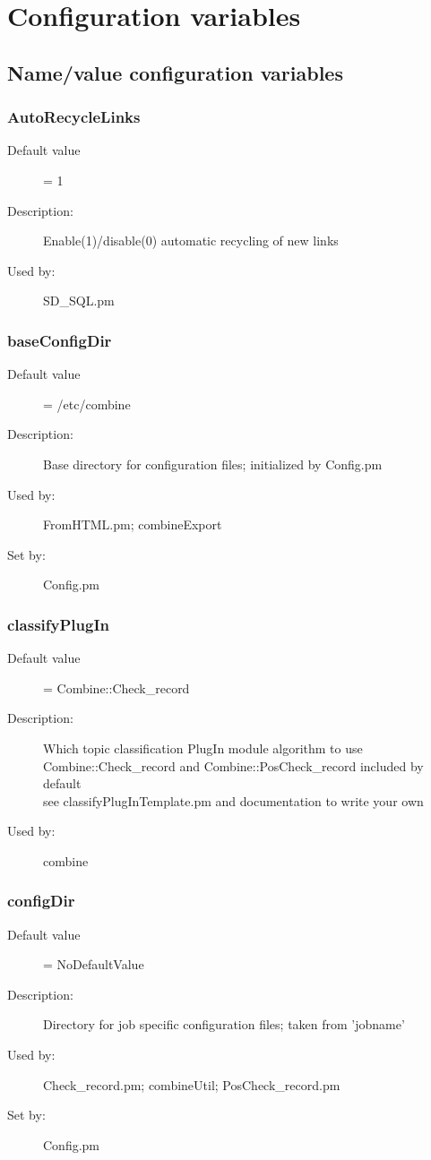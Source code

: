 
\section{Configuration variables}
\label{configvars}
\subsection{Name/value configuration variables}
\subsubsection{AutoRecycleLinks}
\label{AutoRecycleLinks}
\begin{description}
\item[Default value] = 1
\item[Description:] Enable(1)/disable(0) automatic recycling of new links
\item[Used by:] SD\_SQL.pm
\end{description}
\subsubsection{baseConfigDir}
\label{baseConfigDir}
\begin{description}
\item[Default value] = /etc/combine
\item[Description:] Base directory for configuration files; initialized by Config.pm
\item[Used by:] FromHTML.pm; combineExport
\item[Set by:] Config.pm
\end{description}
\subsubsection{classifyPlugIn}
\label{classifyPlugIn}
\begin{description}
\item[Default value] = Combine::Check\_record
\item[Description:] Which topic classification PlugIn module algorithm to use \\ Combine::Check\_record and Combine::PosCheck\_record included by default \\ see classifyPlugInTemplate.pm and documentation to write your own
\item[Used by:] combine
\end{description}
\subsubsection{configDir}
\label{configDir}
\begin{description}
\item[Default value] = NoDefaultValue
\item[Description:] Directory for job specific configuration files; taken from 'jobname'
\item[Used by:] Check\_record.pm; combineUtil; PosCheck\_record.pm
\item[Set by:] Config.pm
\end{description}
